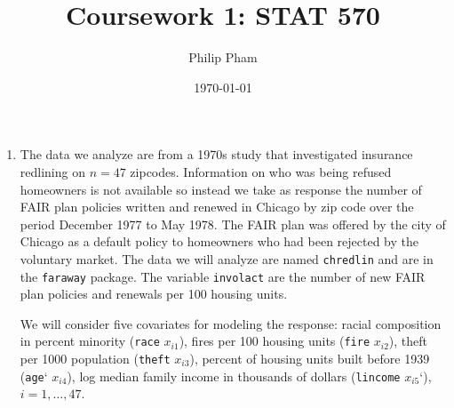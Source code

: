 \documentclass[letterpaper]{article}
\title{Coursework 1: STAT 570}
\author{Philip Pham}
\date{\today}
\begin{document}
\maketitle

\begin{enumerate}
\item The data we analyze are from a 1970s study that investigated insurance
  redlining on $n = 47$ zipcodes. Information on who was being refused
  homeowners is not available so instead we take as response the number of FAIR
  plan policies written and renewed in Chicago by zip code over the period
  December 1977 to May 1978. The FAIR plan was offered by the city of Chicago as
  a default policy to homeowners who had been rejected by the voluntary market.
  The data we will analyze are named \texttt{chredlin} and are in the
  \texttt{faraway} package. The variable \texttt{involact} are the number of new
  FAIR plan policies and renewals per 100 housing units.

  We will consider five covariates for modeling the response: racial composition
  in percent minority (\texttt{race} $x_{i1}$), fires per 100 housing units
  (\texttt{fire} $x_{i2}$), theft per 1000 population (\texttt{theft} $x_{i3}$),
  percent of housing units built before 1939 (\texttt{age}` $x_{i4}$), log
  median family income in thousands of dollars (\texttt{lincome} $x_{i5}$`),
  $i = 1,\ldots,47$.
\end{enumerate}
\end{document}
